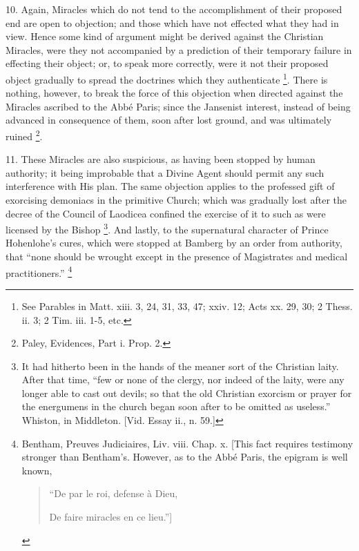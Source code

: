 10. Again, Miracles which do not tend to the
accomplishment of their proposed end are open to objection; and those
which have not effected what they had in view. Hence some kind of
argument might be derived against the Christian Miracles, were they
not accompanied by a prediction of their temporary failure in
effecting their object; or, to speak more correctly, were it not their
proposed object gradually to spread the doctrines which they
authenticate \footnote{See Parables in Matt. xiii. 3, 24, 31, 33,
47; xxiv. 12; Acts xx. 29, 30; 2 Thess. ii. 3; 2 Tim. iii. 1-5, etc.}. There is nothing, however, to break the force
of this objection when directed against the Miracles ascribed to the
Abbé Paris; since the Jansenist interest, instead of being advanced
in consequence of them, soon after lost ground, and was ultimately
ruined \footnote{Paley, Evidences, Part i. Prop. 2.}.

11. These Miracles are also suspicious, as having
been stopped by human authority; it being improbable that a Divine
Agent should permit any such interference with His plan. The same
objection applies to the professed gift of exorcising demoniacs in the
primitive Church; which was gradually lost after the decree of the
Council of Laodicea confined the exercise of it to such as were
licensed by the Bishop \footnote{It had hitherto been in the hands of the
meaner sort of the Christian laity. After that time, ``few or none of
the clergy, nor indeed of the laity, were any longer able to cast out
devils; so that the old Christian exorcism or prayer for the
energumens in the church began soon after to be omitted as useless.''
Whiston, in Middleton. [Vid. Essay ii., n. 59.]}. And lastly, to the supernatural
character of Prince Hohenlohe's cures, which were stopped at Bamberg
by an order from authority, that ``none should be wrought except in
the presence of Magistrates and medical practitioners.'' \footnote{Bentham, Preuves Judiciaires, Liv. viii.
Chap. x. [This fact requires testimony stronger than Bentham's.
However, as to the Abbé Paris, the epigram is well known,

\begin{quote}

``De par le roi, defense à Dieu,

De faire miracles en ce lieu.'']

\end{quote}}

